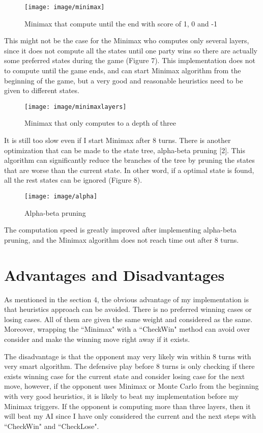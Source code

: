\documentclass[a4paper,titlepage]{article}
\begin{document}
\begin{figure}[!htb]
  \centering
  \texttt{[image: image/minimax]}
  \caption{Minimax that compute until the end with score of 1, 0 and -1}
\end{figure}

This might not be the case for the Minimax who computes only several layers, since it does not compute all the states until one party wins so there are actually some preferred states during the game (Figure 7). This implementation does not to compute until the game ends, and can start Minimax algorithm from the beginning of the game, but a very good and reasonable heuristics need to be given to different states.

\begin{figure}[!htb]
  \centering
  \texttt{[image: image/minimaxlayers]}
  \caption{Minimax that only computes to a depth of three}
\end{figure}

It is still too slow even if I start Minimax after 8 turns. There is another optimization that can be made to the state tree, alpha-beta pruning [2]. This algorithm can significantly reduce the branches of the tree by pruning the states that are worse than the current state. In other word, if a optimal state is found, all the rest states can be ignored (Figure 8).

\begin{figure}[!htb]
  \centering
  \texttt{[image: image/alpha]}
  \caption{Alpha-beta pruning}
\end{figure}

The computation speed is greatly improved after implementing alpha-beta pruning, and the Minimax algorithm does not reach time out after 8 turns.

\section{Advantages and Disadvantages}

As mentioned in the section 4, the obvious advantage of my implementation is that heuristics approach can be avoided. There is no preferred winning cases or losing cases. All of them are given the same weight and considered as the same. Moreover, wrapping the ``Minimax" with a ``CheckWin" method can avoid over consider and make the winning move right away if it exists.

The disadvantage is that the opponent may very likely win within 8 turns with very smart algorithm. The defensive play before 8 turns is only checking if there exists winning case for the current state and consider losing case for the next move, however, if the opponent uses Minimax or Monte Carlo from the beginning with very good heuristics, it is likely to beat my implementation before my Minimax triggers. If the opponent is computing more than three layers, then it will beat my AI since I have only considered the current and the next steps with ``CheckWin" and ``CheckLose".
\end{document}
